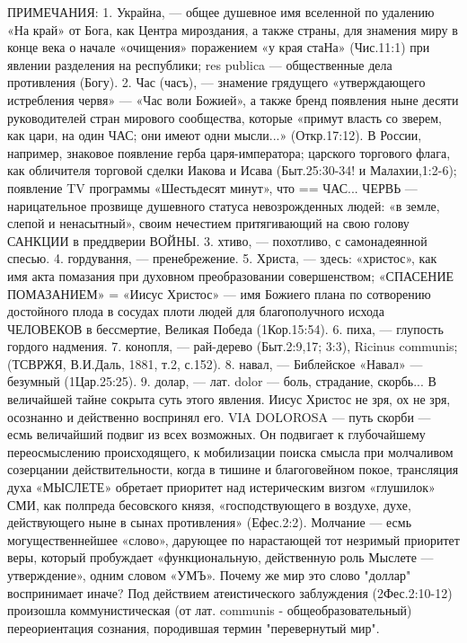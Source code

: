 ПРИМЕЧАНИЯ:
1. Украйна, --- общее душевное имя вселенной по удалению «На край» от Бога, как Центра мироздания, а также страны, для знамения миру в конце века о начале «очищения» поражением «у края стаНа» (Чис.11:1) при явлении разделения на республики;  res  publica --- общественные дела противления (Богу).
2. Час (часъ), --- знамение грядущего «утверждающего истребления червя» --- «Час воли Божией», а также бренд появления ныне десяти руководителей стран мирового сообщества, которые «примут власть со зверем, как цари, на один ЧАС; они имеют одни мысли...» (Откр.17:12). В России, например, знаковое появление герба царя-императора; царского торгового флага, как обличителя торговой сделки Иакова и Исава (Быт.25:30-34! и Малахии,1:2-6); появление TV программы «Шестьдесят минут», что == ЧАС...
         ЧЕРВЬ --- нарицательное прозвище душевного статуса невозрожденных людей: «в земле, слепой и ненасытный», своим нечестием притягивающий на свою голову САНКЦИИ в преддверии ВОЙНЫ.
3. хтиво, --- похотливо, с самонадеянной спесью.
4. гордування, --- пренебрежение.
5. Христа, --- здесь: «христос», как имя акта помазания при духовном преобразовании совершенством;
    «СПАСЕНИЕ ПОМАЗАНИЕМ» = «Иисус Христос» --- имя Божиего плана по сотворению достойного плода в сосудах плоти людей для благополучного исхода  ЧЕЛОВЕКОВ в бессмертие, Великая Победа (1Кор.15:54).
6. пиха, --- глупость гордого надмения.
7. конопля, --- рай-дерево (Быт.2:9,17; 3:3), Ricinus communis; (ТСВРЖЯ, В.И.Даль, 1881, т.2, с.152).
8. навал, --- Библейское «Навал» --- безумный (1Цар.25:25).
9. долар, --- лат. dolor --- боль, страдание, скорбь... В величайшей тайне сокрыта суть этого явления. Иисус Христос не зря, ох не зря, осознанно и действенно воспринял его.  VIA DOLOROSA --- путь скорби --- есмь величайший подвиг из всех возможных. Он подвигает к глубочайшему переосмыслению происходящего, к мобилизации поиска смысла при молчаливом созерцании действительности, когда в тишине и благоговейном покое, трансляция духа «МЫСЛЕТЕ» обретает приоритет над истерическим визгом «глушилок» СМИ, как полпреда бесовского князя, «господствующего в воздухе, духе, действующего ныне в сынах противления» (Ефес.2:2).
    Молчание --- есмь могущественнейшее «слово», дарующее по нарастающей тот незримый приоритет веры, который пробуждает «функциональную, действенную роль Мыслете --- утверждение», одним словом «УМЪ».
    Почему же мир это слово "доллар" воспринимает иначе? Под действием атеистического заблуждения (2Фес.2:10-12) произошла коммунистическая (от лат. communis - общеобразовательный) переориентация сознания, породившая термин "перевернутый мир".

